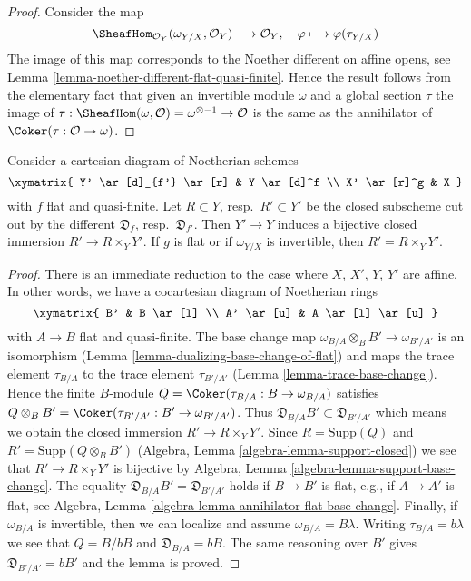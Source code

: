 \begin{proof}
Consider the map
$$
\SheafHom_{\mathcal{O}_Y}(\omega_{Y/X}, \mathcal{O}_Y)
\longrightarrow
\mathcal{O}_Y,\quad
\varphi \longmapsto \varphi(\tau_{Y/X})
$$
The image of this map corresponds to the Noether different
on affine opens, see Lemma \ref{lemma-noether-different-flat-quasi-finite}.
Hence the result follows from the elementary fact that given
an invertible module $\omega$ and a global section $\tau$
the image of
$\tau : \SheafHom(\omega, \mathcal{O}) = \omega^{\otimes -1} \to \mathcal{O}$
is the same as the annihilator of $\Coker(\tau : \mathcal{O} \to \omega)$.
\end{proof}

\begin{lemma}
\label{lemma-base-change-different}
Consider a cartesian diagram of Noetherian schemes
$$
\xymatrix{
Y' \ar[d]_{f'} \ar[r] & Y \ar[d]^f \\
X' \ar[r]^g & X
}
$$
with $f$ flat and quasi-finite. Let $R \subset Y$, resp.\ $R' \subset Y'$
be the closed subscheme cut out by the different
$\mathfrak{D}_f$, resp.\ $\mathfrak{D}_{f'}$.
Then $Y' \to Y$ induces a bijective closed immersion $R' \to R \times_Y Y'$.
If $g$ is flat or if $\omega_{Y/X}$ is invertible, then
$R' = R \times_Y Y'$.
\end{lemma}

\begin{proof}
There is an immediate reduction to the case where $X$, $X'$, $Y$, $Y'$
are affine. In other words, we have a cocartesian diagram of Noetherian
rings
$$
\xymatrix{
B' & B \ar[l] \\
A' \ar[u] & A \ar[l] \ar[u]
}
$$
with $A \to B$ flat and quasi-finite. The base change map
$\omega_{B/A} \otimes_B B' \to \omega_{B'/A'}$ is an isomorphism
(Lemma \ref{lemma-dualizing-base-change-of-flat}) and maps
the trace element $\tau_{B/A}$ to the trace element $\tau_{B'/A'}$
(Lemma \ref{lemma-trace-base-change}).
Hence the finite $B$-module $Q = \Coker(\tau_{B/A} : B \to \omega_{B/A})$
satisfies $Q \otimes_B B' = \Coker(\tau_{B'/A'} : B' \to \omega_{B'/A'})$.
Thus $\mathfrak{D}_{B/A}B' \subset \mathfrak{D}_{B'/A'}$ which means
we obtain the closed immersion $R' \to R \times_Y Y'$.
Since $R = \text{Supp}(Q)$ and $R' = \text{Supp}(Q \otimes_B B')$
(Algebra, Lemma \ref{algebra-lemma-support-closed})
we see that $R' \to R \times_Y Y'$ is bijective by
Algebra, Lemma \ref{algebra-lemma-support-base-change}.
The equality $\mathfrak{D}_{B/A}B' = \mathfrak{D}_{B'/A'}$ holds
if $B \to B'$ is flat, e.g., if $A \to A'$ is flat, see
Algebra, Lemma \ref{algebra-lemma-annihilator-flat-base-change}.
Finally, if $\omega_{B/A}$ is invertible, then we can localize
and assume $\omega_{B/A} = B \lambda$. Writing $\tau_{B/A} = b\lambda$
we see that $Q = B/bB$ and $\mathfrak{D}_{B/A} = bB$.
The same reasoning over $B'$
gives $\mathfrak{D}_{B'/A'} = bB'$ and the lemma is proved.
\end{proof}

